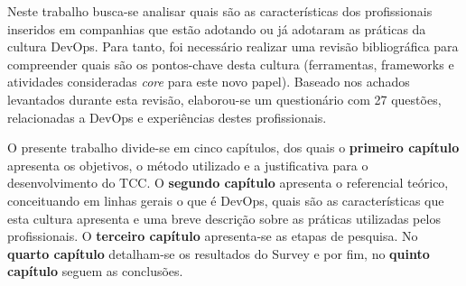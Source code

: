 \documentclass[twoside,english,brazilian]{UNISINOSartigo}
\begin{document}


Neste trabalho busca-se analisar quais são as características dos profissionais inseridos em companhias que estão adotando ou já adotaram as práticas da cultura DevOps. Para tanto, foi necessário realizar uma revisão bibliográfica para compreender quais são os pontos-chave desta cultura (ferramentas, frameworks e atividades consideradas \textit{core} para este novo papel). Baseado nos achados levantados durante esta revisão, elaborou-se um questionário com 27 questões, relacionadas a DevOps e experiências destes profissionais. 

O presente trabalho divide-se em cinco capítulos, dos quais o \textbf{primeiro capítulo} apresenta os objetivos, o método utilizado e a justificativa para o desenvolvimento do TCC. O \textbf{segundo capítulo} apresenta o referencial teórico, conceituando em linhas gerais o que é DevOps, quais são as características que esta cultura apresenta e uma breve descrição sobre as práticas utilizadas pelos profissionais. O \textbf{terceiro capítulo} apresenta-se as etapas de pesquisa. No \textbf{quarto capítulo} detalham-se os resultados do Survey e por fim, no \textbf{quinto capítulo} seguem as conclusões.
\end{document}
